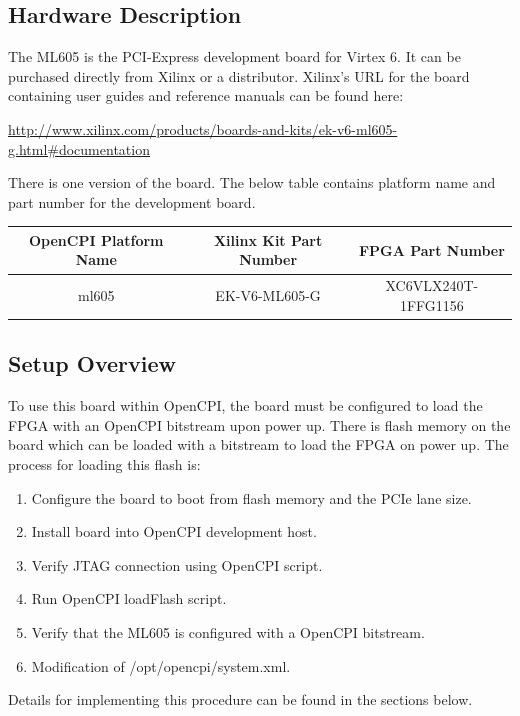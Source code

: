\subsection{Hardware Description}
The ML605 is the PCI-Express development board for Virtex 6. It can be purchased directly from Xilinx or a distributor. Xilinx's URL for the board containing user guides and reference manuals can be found here:\par\bigskip
​\url{http://www.xilinx.com/products/boards-and-kits/ek-v6-ml605-g.html#documentation}\par\bigskip
\noindent  There is one version of the board. The below table contains platform name and part number for the development board.\par\bigskip
\begin{tabular}{|c|c|c|}
	\hline
	\rowcolor{blue}OpenCPI Platform Name & Xilinx Kit Part Number & FPGA Part Number \\
	\hline
	ml605 & EK-V6-ML605-G & XC6VLX240T-1FFG1156 \\
	\hline
\end{tabular}\par\bigskip

\subsection{Setup Overview}
To use this board within OpenCPI, the board must be configured to load the FPGA with an OpenCPI bitstream upon power up. There is flash memory on the board which can be loaded with a bitstream to load the FPGA on power up. The process for loading this flash is:
\begin{enumerate}
	\item Configure the board to boot from flash memory and the PCIe lane size.
	\item Install board into OpenCPI development host.
	\item Verify JTAG connection using OpenCPI script.
	\item Run OpenCPI loadFlash script.
	\item Verify that the ML605 is configured with a OpenCPI bitstream.
	\item Modification of /opt/opencpi/system.xml.
\end{enumerate}
Details for implementing this procedure can be found in the sections below.

\pagebreak
